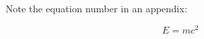 \documentclass[preprint]{JASA}
\begin{document}
Note the equation number in an appendix:

\[E=mc^2\]









\end{document}
